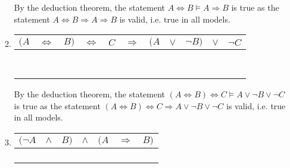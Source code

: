 \begin{enumerate}
\begin{enumerate}
By the deduction theorem, the statement $A \Leftrightarrow B \vDash A \Rightarrow B$ is true as the statement $A \Leftrightarrow B \Rightarrow A \Rightarrow B$ is valid, i.e. true in all models.
\item
\begin{tabular}{ccccc|c|ccccc}
$(A$ & $\Leftrightarrow$ & $B)$ & $\Leftrightarrow$ & $C$ & $\Rightarrow$ & $(A$ & $\lor$ & $\neg B)$ & $\lor$ & $\neg C$ \\
\hline
\F   & \T                & \F   & \F                & \F  & \T            & \F   & \T     & \T        & \T     & \T       \\
\F   & \T                & \F   & \T                & \T  & \T            & \F   & \T     & \T        & \T     & \F       \\
\F   & \F                & \T   & \T                & \F  & \T            & \F   & \F     & \F        & \T     & \T       \\
\F   & \F                & \T   & \F                & \T  & \T            & \F   & \F     & \F        & \F     & \F       \\
\T   & \F                & \F   & \T                & \F  & \T            & \T   & \T     & \T        & \T     & \T       \\
\T   & \F                & \F   & \F                & \T  & \T            & \T   & \T     & \T        & \T     & \F       \\
\T   & \T                & \T   & \F                & \F  & \T            & \T   & \T     & \F        & \T     & \T       \\
\T   & \T                & \T   & \T                & \T  & \T            & \T   & \T     & \F        & \T     & \F       \\
\end{tabular}

By the deduction theorem, the statement $(A \Leftrightarrow B) \Leftrightarrow C \vDash A \lor \neg B \lor \neg C$ is true as the statement $(A \Leftrightarrow B) \Leftrightarrow C \Rightarrow A \lor \neg B \lor \neg C$ is valid, i.e. true in all models.
\item
\begin{tabular}{ccc|c|ccc}
$(\neg A$ & $\land$ & $B)$ & $\land$ & $(A$ & $\Rightarrow$ & $B)$\\
\hline
\T        & \F      & \F   & \F      & \F   & \T            & \F  \\
\T        & \T      & \T   & \T      & \F   & \T            & \T  \\
\F        & \F      & \F   & \F      & \T   & \F            & \F  \\
\F        & \F      & \T   & \F      & \T   & \T            & \T  \\
\end{tabular}


\end{enumerate}
\end{enumerate}
